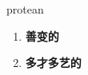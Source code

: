 
\begin{frame}
{\huge protean}
\begin{center}
\begin{enumerate}\Large
  \item \textbf{善变的}
  \item \textbf{多才多艺的}
\end{enumerate}
\end{center}
\end{frame}
